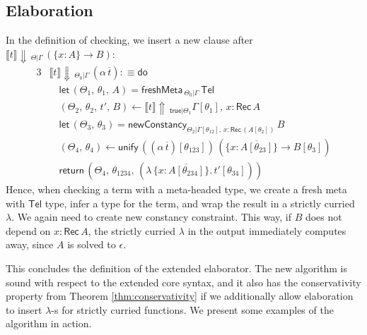 \documentclass[acmsmall,review,anonymous,prologue,dvipsnames]{acmart}\settopmatter{printfolios=true,printccs=false,printacmref=false}
\newcommand{\slet}{\boldsymbol{\mathsf{let}}}
\newcommand{\freshMeta}[3]{\mathsf{freshMeta}\,_{#1|#2}\,#3}
\newcommand{\newConstancy}[5]{\mathsf{newConstancy}_{#1|#2,\,#3 : \Rec\,#4}\,#5}
\newcommand{\unify}{\mathsf{unify}}
\newcommand{\echeck}[4]{\llbracket#1\rrbracket\!\Downarrow\,_{#2|#3}\,#4}
\newcommand{\einfer}[3]{\llbracket#1\rrbracket\!\Uparrow\,_{#2|#3}}
\newcommand{\edo}{\boldsymbol{\mathsf{do}}}
\newcommand{\ereturn}{\boldsymbol{\mathsf{return}}}
\newcommand{\true}{\mathsf{true}}
\newcommand{\Tel}{\mathsf{Tel}}
\newcommand{\Rec}{\mathsf{Rec}}
\newcommand{\ol}[1]{\overline{#1}}
\theoremstyle{remark}
\begin{document}
\subsection{Elaboration}

In the definition of checking, we insert a new clause after
$\echeck{t}{\Theta}{\Gamma}{(\{x : A\}\to B)}$:
\begin{alignat*}{3}
& \echeck{t}{\Theta_0}{\Gamma}{(\alpha\,\ol{t})} :\equiv \edo\\
& \quad \slet\,(\Theta_1,\,\theta_1,\,A) = \freshMeta{\Theta_0}{\Gamma}{\Tel}\\
& \quad (\Theta_2,\,\theta_2,\,t',\,B) \leftarrow \einfer{t}{\true}{\Theta_1}{\Gamma[\theta_1],\,x:\Rec\,A}\\
& \quad \slet\,(\Theta_3,\,\theta_3) = \newConstancy{\Theta_2}{\Gamma[\theta_{12}]}{x}{(A[\theta_2])}{B}\\
& \quad (\Theta_4,\,\theta_4) \leftarrow
            \unify\, ((\alpha\,\ol{t})[\theta_{123}])\,(\{x : \ol{A[\theta_{23}]}\} \to B[\theta_3])\\
& \quad \ereturn\,(\Theta_4,\,\theta_{1234},\,(\lambda\,\{x : \ol{A[\theta_{234}]}\}.\,t'[\theta_{34}]))
\end{alignat*}
Hence, when checking a term with a meta-headed type, we create a fresh meta with
$\Tel$ type, infer a type for the term, and wrap the result in a strictly
curried $\lambda$. We again need to create new constancy constraint. This way,
if $B$ does not depend on $x : \Rec\,A$, the strictly curried $\lambda$ in the
output immediately computes away, since $A$ is solved to $\epsilon$.

This concludes the definition of the extended elaborator. The new algorithm is
sound with respect to the extended core syntax, and it also has the
conservativity property from Theorem \ref{thm:conservativity} if we additionally
allow elaboration to insert $\lambda$-s for strictly curried functions. We present
some examples of the algorithm in action.
\end{document}
